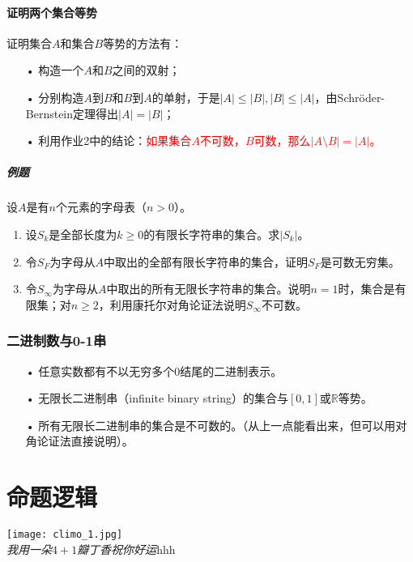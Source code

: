 \documentclass[b5paper,oneside]{ctexbook}
\newcommand{\Red}[1]{\textcolor[named]{red}{#1}}
\begin{document}
\subsubsection{证明两个集合等势}
证明集合$A$和集合$B$等势的方法有：
\begin{enumerate}
\item[•]构造一个$A$和$B$之间的双射；
\item[•]分别构造$A$到$B$和$B$到$A$的单射，于是$|A|\leq |B|,|B|\leq |A|$，由Schr\"oder-Bernstein定理得出$|A|=|B|$；
\item[•]利用作业2中的结论：\Red{如果集合$A$不可数，$B$可数，那么$|A\setminus B|=|A|$。}
\end{enumerate}
\paragraph{例题}设$A$是有$n$个元素的字母表（$n>0$）。\label{alphabet}
\begin{enumerate}
\item 设$S_k$是全部长度为$k\geq 0$的有限长字符串的集合。求$|S_k|$。
\item 令$S_F$为字母从$A$中取出的全部有限长字符串的集合，证明$S_F$是可数无穷集。
\item 令$S_\infty$为字母从$A$中取出的所有无限长字符串的集合。说明$n=1$时，集合是有限集；对$n\geq 2$，利用康托尔对角论证法说明$S_\infty$不可数。
\end{enumerate}
\subsection{二进制数与0-1串}
\begin{enumerate}
\item[•]任意实数都有不以无穷多个0结尾的二进制表示。
\item[•]无限长二进制串（infinite binary string）的集合与$[0,1]$或$\mathbb{R}$等势。
\item[•]所有无限长二进制串的集合是不可数的。（从上一点能看出来，但可以用对角论证法直接说明）。
\end{enumerate}
\chapter{命题逻辑}
\vspace*{\fill}
\begin{center}
\texttt{[image: climo\_1.jpg]}
\\\emph{我用一朵$4+1$瓣丁香祝你好运}hhh
\end{center}
\vspace*{\fill}
\clearpage
\end{document}

